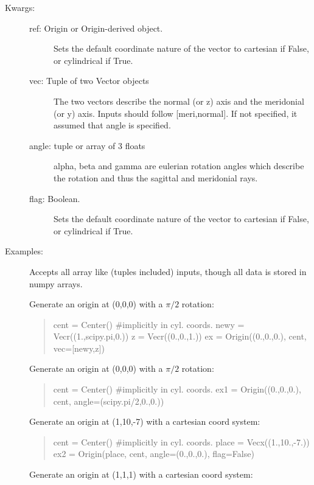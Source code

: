 \documentclass[letterpaper,10pt,english]{sphinxmanual}
\begin{document}
\begin{fulllineitems}
\begin{description}
\item[{Kwargs:}] \leavevmode\begin{description}
\item[{ref: Origin or Origin-derived object.}] \leavevmode
Sets the default coordinate nature of the vector to 
cartesian if False, or cylindrical if True.

\item[{vec: Tuple of two Vector objects}] \leavevmode
The two vectors describe the normal (or z) axis and
the meridonial (or y) axis. Inputs should follow
{[}meri,normal{]}. If not specified, it assumed that angle
is specified.

\item[{angle: tuple or array of 3 floats}] \leavevmode
alpha, beta and gamma are eulerian rotation angles which
describe the rotation and thus the sagittal and 
meridonial rays.

\item[{flag: Boolean.}] \leavevmode
Sets the default coordinate nature of the vector to 
cartesian if False, or cylindrical if True.

\end{description}

\item[{Examples:   }] \leavevmode
Accepts all array like (tuples included) inputs, though all data 
is stored in numpy arrays.

Generate an origin at (0,0,0) with a $\pi/2$ rotation:
\begin{quote}

cent = Center() \#implicitly in cyl. coords.
newy = Vecr((1.,scipy.pi,0.))
z = Vecr((0.,0.,1.))
ex = Origin((0.,0.,0.), cent, vec={[}newy,z{]})
\end{quote}

Generate an origin at (0,0,0) with a $\pi/2$ rotation:
\begin{quote}

cent = Center() \#implicitly in cyl. coords.
ex1 = Origin((0.,0.,0.), cent, angle=(scipy.pi/2,0.,0.))
\end{quote}

Generate an origin at (1,10,-7) with a cartesian coord system:
\begin{quote}

cent = Center() \#implicitly in cyl. coords.
place = Vecx((1.,10.,-7.))
ex2 = Origin(place, cent, angle=(0.,0.,0.), flag=False)
\end{quote}

Generate an origin at (1,1,1) with a cartesian coord system:
\begin{quote}


\end{quote}
\end{description}
\end{fulllineitems}
\end{document}
